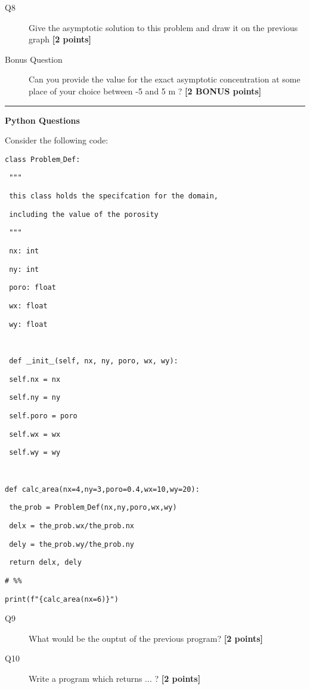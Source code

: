 \documentclass{article}
\begin{document}

\begin{description}
\item [Q8] Give the asymptotic solution to this problem and draw it on the previous graph  \textbf{[2 points]}

\item[Bonus Question] Can you provide the value for the exact asymptotic concentration at some place of your choice between -5 and 5 m ? \textbf{[2 BONUS points]}
\vspace{2cm}

\end{description}

\rule{15cm}{0.75pt}

\textbf{Python Questions}

Consider the following code:


\texttt{class Problem$\_$Def:}

\texttt{   """}

\texttt{   this class holds the specifcation for the domain,}

\texttt{   including the value of the porosity}

\texttt{   """}

\texttt{   nx: int}

\texttt{   ny: int}

\texttt{   poro: float}

\texttt{   wx: float}

\texttt{   wy: float}

\texttt{ }

\texttt{   def $\_\_$init$\_\_$(self, nx, ny, poro, wx, wy):}

\texttt{       self.nx = nx}

\texttt{       self.ny = ny}

\texttt{       self.poro = poro}

\texttt{       self.wx = wx}

\texttt{       self.wy = wy}

\texttt{ }

\texttt{def calc$\_$area(nx=4,ny=3,poro=0.4,wx=10,wy=20):}

\texttt{   the$\_$prob = Problem$\_$Def(nx,ny,poro,wx,wy)}

\texttt{   delx = the$\_$prob.wx/the$\_$prob.nx}

\texttt{   dely = the$\_$prob.wy/the$\_$prob.ny}

\texttt{   return delx, dely}

\texttt{\# \%\%}

\texttt{print(f"\{calc$\_$area(nx=6)\}")}

\begin{description}
\item[Q9] What would be the ouptut of the previous program? \textbf{[2 points]}
\vspace{2cm}
\item[Q10] Write a program which returns ... ? \textbf{[2 points]}
\end{description}
\end{document}
